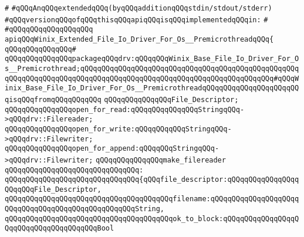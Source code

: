 \verb|#|\newline
\verb|#qQQqAnqQQqextendedqQQq(byqQQqadditionqQQqstdin/stdout/stderr)|\newline
\verb|#qQQqversionqQQqofqQQqthisqQQqapiqQQqisqQQqimplementedqQQqin:|\newline
\verb|#|\newline
\verb|#qQQqqQQqqQQqqQQqqQQq|\newline
\newline
\verb|apiqQQqWinix_Extended_File_Io_Driver_For_Os__PremicrothreadqQQq{|\newline
\verb|qQQqqQQqqQQqqQQq#|\newline
\verb|qQQqqQQqqQQqqQQqpackageqQQqdrv:qQQqqQQqWinix_Base_File_Io_Driver_For_Os__Premicrothread;qQQqqQQqqQQqqQQqqQQqqQQqqQQqqQQqqQQqqQQqqQQqqQQqqQQqqQQqqQQqqQQqqQQqqQQqqQQqqQQqqQQqqQQqqQQqqQQqqQQqqQQqqQQqqQQqqQQq#qQQqWinix_Base_File_Io_Driver_For_Os__PremicrothreadqQQqqQQqqQQqqQQqqQQqqQQqisqQQqfromqQQqqQQqqQQq|\newline
\newline
\verb|qQQqqQQqqQQqqQQqFile_Descriptor;|\newline
\newline
\verb|qQQqqQQqqQQqqQQqopen_for_read:qQQqqQQqqQQqqQQqStringqQQq->qQQqdrv::Filereader;|\newline
\verb|qQQqqQQqqQQqqQQqopen_for_write:qQQqqQQqqQQqStringqQQq->qQQqdrv::Filewriter;|\newline
\verb|qQQqqQQqqQQqqQQqopen_for_append:qQQqqQQqStringqQQq->qQQqdrv::Filewriter;|\newline
\newline
\verb|qQQqqQQqqQQqqQQqmake_filereader|\newline
\verb|qQQqqQQqqQQqqQQqqQQqqQQqqQQqqQQq:|\newline
\verb|qQQqqQQqqQQqqQQqqQQqqQQqqQQqqQQq{qQQqfile_descriptor:qQQqqQQqqQQqqQQqqQQqqQQqFile_Descriptor,|\newline
\verb|qQQqqQQqqQQqqQQqqQQqqQQqqQQqqQQqqQQqqQQqfilename:qQQqqQQqqQQqqQQqqQQqqQQqqQQqqQQqqQQqqQQqqQQqqQQqqQQqString,|\newline
\verb|qQQqqQQqqQQqqQQqqQQqqQQqqQQqqQQqqQQqqQQqok_to_block:qQQqqQQqqQQqqQQqqQQqqQQqqQQqqQQqqQQqqQQqBool|\newline
